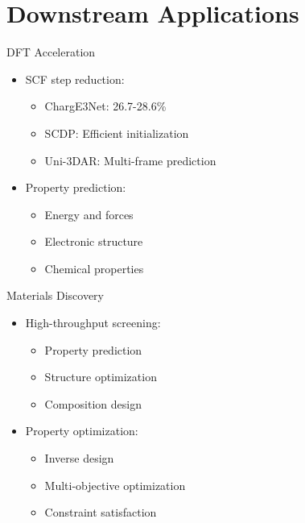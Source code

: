 \section{Downstream Applications}

\begin{frame}{DFT Acceleration}
    \begin{itemize}
        \item SCF step reduction:
        \begin{itemize}
            \item ChargE3Net: 26.7-28.6\%
            \item SCDP: Efficient initialization
            \item Uni-3DAR: Multi-frame prediction
        \end{itemize}
        \item Property prediction:
        \begin{itemize}
            \item Energy and forces
            \item Electronic structure
            \item Chemical properties
        \end{itemize}
    \end{itemize}
\end{frame}

\begin{frame}{Materials Discovery}
    \begin{itemize}
        \item High-throughput screening:
        \begin{itemize}
            \item Property prediction
            \item Structure optimization
            \item Composition design
        \end{itemize}
        \item Property optimization:
        \begin{itemize}
            \item Inverse design
            \item Multi-objective optimization
            \item Constraint satisfaction
        \end{itemize}
    \end{itemize}
\end{frame}


